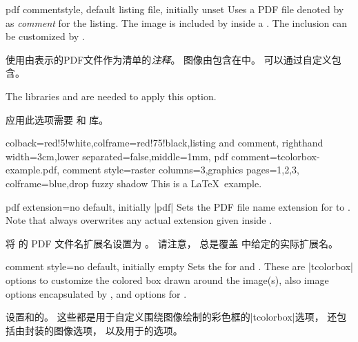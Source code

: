\begin{docTcbKey}[][doc new=2014-11-14]{pdf comment}{}{style, default listing file, initially unset}
Uses a PDF file denoted by  as \textit{comment} for the listing.
The image is included by  inside a .
The inclusion can be customized by .

使用由表示的PDF文件作为清单的\textit{注释}。 图像由包含在中。 可以通过自定义包含。
\begin{marker}
The libraries  and  are needed to apply this option.

应用此选项需要  和  库。
\end{marker}
\medskip
\begin{dispExample}
\begin{tcblisting}{colback=red!5!white,colframe=red!75!black,listing and comment,
righthand width=3cm,lower separated=false,middle=1mm,
pdf comment={tcolorbox-example.pdf},
comment style={raster columns=3,graphics pages={1,2,3},
colframe=blue,drop fuzzy shadow}}
This is a \LaTeX\ example.
\end{tcblisting}
\end{dispExample}
\end{docTcbKey}



\begin{docTcbKey}[][doc new=2014-11-14]{pdf extension}{=}{no default, initially |pdf|}
Sets the PDF file name extension for  to .
Note that  always overwrites any actual extension given
inside .

将  的 PDF 文件名扩展名设置为 。 请注意， 总是覆盖  中给定的实际扩展名。
\end{docTcbKey}


\begin{docTcbKey}[][doc new=2014-11-14]{comment style}{=}{no default, initially empty}
Sets the  for  and .
These are |tcolorbox| options to customize the colored box drawn around the
image(s), also image options encapsulated by ,
and  options for .

设置和的。 这些都是用于自定义围绕图像绘制的彩色框的|tcolorbox|选项， 还包括由封装的图像选项， 以及用于的选项。
\end{docTcbKey}


